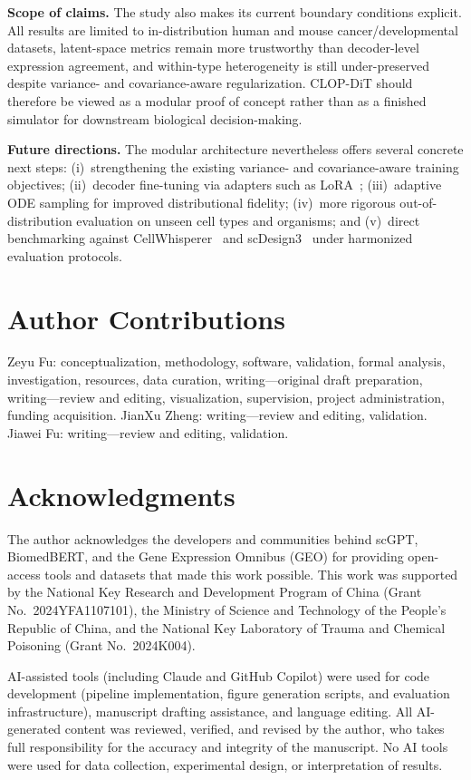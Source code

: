\documentclass[fleqn,10pt,lineno]{wlpeerj}
\begin{document}
\textbf{Scope of claims.} The study also makes its current boundary conditions explicit. All results are limited to in-distribution human and mouse cancer/developmental datasets, latent-space metrics remain more trustworthy than decoder-level expression agreement, and within-type heterogeneity is still under-preserved despite variance- and covariance-aware regularization. CLOP-DiT should therefore be viewed as a modular proof of concept rather than as a finished simulator for downstream biological decision-making.

\textbf{Future directions.} The modular architecture nevertheless offers several concrete next steps: (i)~strengthening the existing variance- and covariance-aware training objectives; (ii)~decoder fine-tuning via adapters such as LoRA~\citep{ref-scgpt}; (iii)~adaptive ODE sampling for improved distributional fidelity; (iv)~more rigorous out-of-distribution evaluation on unseen cell types and organisms; and (v)~direct benchmarking against CellWhisperer~\citep{ref-cellwhisperer} and scDesign3~\citep{ref-scdesign3} under harmonized evaluation protocols.

\section*{Author Contributions}

Zeyu Fu: conceptualization, methodology, software, validation, formal analysis, investigation, resources, data curation, writing---original draft preparation, writing---review and editing, visualization, supervision, project administration, funding acquisition. JianXu Zheng: writing---review and editing, validation. Jiawei Fu: writing---review and editing, validation.

\section*{Acknowledgments}

The author acknowledges the developers and communities behind scGPT, BiomedBERT, and the Gene Expression Omnibus (GEO) for providing open-access tools and datasets that made this work possible. This work was supported by the National Key Research and Development Program of China (Grant No.~2024YFA1107101), the Ministry of Science and Technology of the People's Republic of China, and the National Key Laboratory of Trauma and Chemical Poisoning (Grant No.~2024K004).

AI-assisted tools (including Claude and GitHub Copilot) were used for code development (pipeline implementation, figure generation scripts, and evaluation infrastructure), manuscript drafting assistance, and language editing. All AI-generated content was reviewed, verified, and revised by the author, who takes full responsibility for the accuracy and integrity of the manuscript. No AI tools were used for data collection, experimental design, or interpretation of results.
\end{document}
